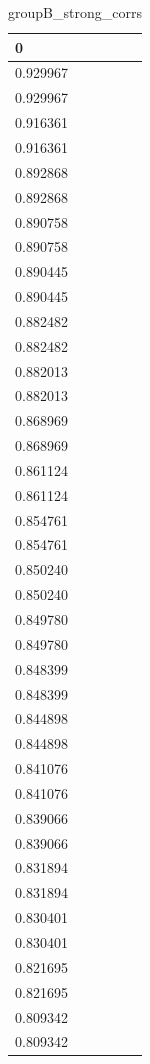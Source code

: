 \begin{table}
\caption{groupB_strong_corrs}
\label{tab:groupB_strong_corrs}
\begin{tabular}{lcr}
\toprule
0 \\
\midrule
0.929967 \\
0.929967 \\
0.916361 \\
0.916361 \\
0.892868 \\
0.892868 \\
0.890758 \\
0.890758 \\
0.890445 \\
0.890445 \\
0.882482 \\
0.882482 \\
0.882013 \\
0.882013 \\
0.868969 \\
0.868969 \\
0.861124 \\
0.861124 \\
0.854761 \\
0.854761 \\
0.850240 \\
0.850240 \\
0.849780 \\
0.849780 \\
0.848399 \\
0.848399 \\
0.844898 \\
0.844898 \\
0.841076 \\
0.841076 \\
0.839066 \\
0.839066 \\
0.831894 \\
0.831894 \\
0.830401 \\
0.830401 \\
0.821695 \\
0.821695 \\
0.809342 \\
0.809342 \\
\bottomrule
\end{tabular}
\end{table}
